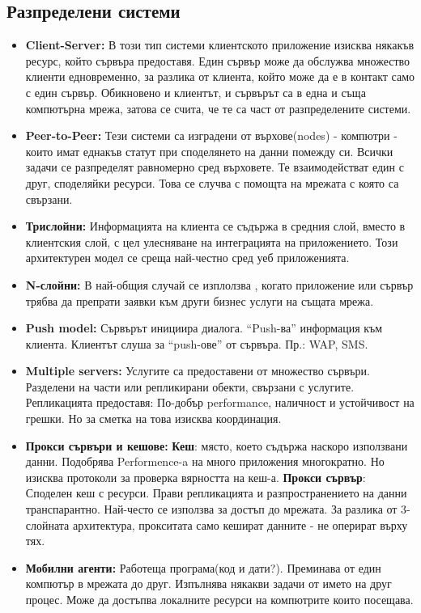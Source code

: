 \documentclass[11pt]{article} %
\begin{document}
\subsection{Разпределени системи}
\begin{itemize}[noitemsep]
	\item \textbf{Client-Server: } В този тип системи клиентското приложение изисква някакъв ресурс, който сървъра предоставя. Един сървър може да обслужва множество клиенти едновременно, за разлика от клиента, който може да е в контакт само с един сървър. Обикновено и клиентът, и сървърът са в една и съща компютърна мрежа, затова се счита, че те са част от разпределените системи. 
	\item \textbf{Peer-to-Peer: } Тези системи са изградени от върхове(nodes) - компютри - които имат еднакъв статут при споделянето на данни помежду си. Всички задачи се разпределят равномерно сред върховете. Те взаимодействат един с друг, споделяйки ресурси. Това се случва с помощта на мрежата с която са свързани.  
	\item \textbf{Трислойни: } Информацията на клиента се съдържа в средния слой, вместо в клиентския слой, с цел улесняване на интеграцията на приложението. Този архитектурен модел се среща най-честно сред уеб приложенията.
	\item \textbf{N-слойни: } В най-общия случай се изплолзва , когато приложение или сървър трябва да препрати заявки към други бизнес услуги на същата мрежа. 
	\item \textbf{Push model: } Сървърът инициира диалога. \enquote{Push-ва} информация към клиента. Клиентът слуша за \enquote{push-ове} от сървъра. Пр.: WAP, SMS.
	\item \textbf{Multiple servers: } Услугите са предоставени от множество сървъри. Разделени на части или репликирани обекти, свързани с услугите. Репликацията предоставя: По-добър performance, наличност и устойчивост на грешки. Но за сметка на това изисква координация.
	\item \textbf{Прокси сървъри и кешове: } \textbf{Кеш}: място, което съдържа наскоро използвани данни. Подобрява Performence-a на много приложения многократно. Но изисква протоколи за проверка вярността на кеш-а. \textbf{Прокси сървър}: Споделен кеш с ресурси. Прави репликацията и разпространението на данни транспарантно. Най-често се използва за достъп до мрежата. За разлика от 3-слойната архитектура, прокситата само кешират данните - не оперират върху тях.
	\item \textbf{Мобилни агенти: } Работеща програма(код и дати?). Преминава от един компютър в мрежата до друг. Изпълнява някакви задачи от името на друг процес. Може да достъпва локалните ресурси на компютрите които посещава.

\end{itemize}
\end{document}
